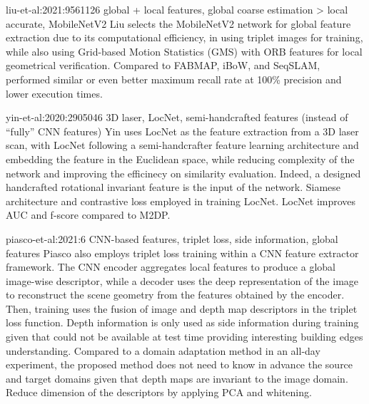 liu-et-al:2021:9561126 global + local features, global coarse estimation > local accurate, MobileNetV2
Liu selects the MobileNetV2 network for global feature extraction due to its computational efficiency, in using triplet images for training, while also using  Grid-based Motion Statistics (GMS) with ORB features for local geometrical verification. Compared to FABMAP, iBoW, and SeqSLAM, performed similar or even better maximum recall rate at 100\% precision and lower execution times.

yin-et-al:2020:2905046 3D laser, LocNet, semi-handcrafted features (instead of ``fully'' CNN features)
Yin uses LocNet as the feature extraction from a 3D laser scan, with LocNet following a semi-handcrafter feature learning architecture and embedding the feature in the Euclidean space, while reducing complexity of the network and improving the efficinecy on similarity evaluation. Indeed, a designed handcrafted rotational invariant feature is the input of the network. Siamese architecture and contrastive loss employed in training LocNet.
LocNet improves AUC and f-score compared to M2DP.



piasco-et-al:2021:6 CNN-based features, triplet loss, side information, global features
Piasco also employs triplet loss training within a CNN feature extractor framework. The CNN encoder aggregates local features to produce a global image-wise descriptor, while a decoder uses the deep representation of the image to reconstruct the scene geometry from the features obtained by the encoder. Then, training uses the fusion of image and depth map descriptors in the triplet loss function. Depth information is only used as side information during training given that could not be available at test time providing interesting building edges understanding. Compared to a domain adaptation method in an all-day experiment, the proposed method does not need to know in advance the source and target domains given that depth maps are invariant to the image domain.
Reduce dimension of the descriptors by applying PCA and whitening.




